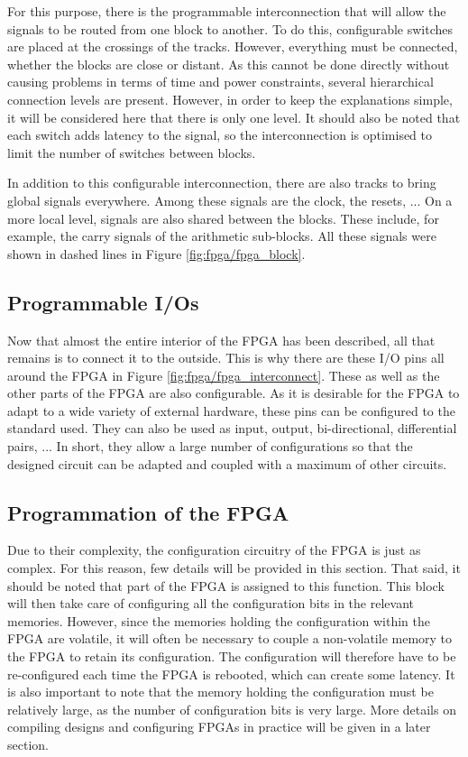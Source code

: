 For this purpose, there is the programmable interconnection that will allow the signals to be routed 
from one block to another. To do this, configurable switches are placed at the crossings of the 
tracks. However, everything must be connected, whether the blocks are close or distant. As this 
cannot be done directly without causing problems in terms of time and power constraints, several 
hierarchical connection levels are present. However, in order to keep the explanations simple, it 
will be considered here that there is only one level. It should also be noted that each switch adds 
latency to the signal, so the interconnection is optimised to limit the number of switches between 
blocks. 

In addition to this configurable interconnection, there are also tracks to bring global signals 
everywhere. Among these signals are the clock, the resets, ... On a more local level, signals are 
also shared between the blocks. These include, for example, the carry signals of the arithmetic 
sub-blocks. All these signals were shown in dashed lines in Figure \ref{fig:fpga/fpga_block}.

\subsection{Programmable I/Os}

Now that almost the entire interior of the FPGA has been described, all that remains is to connect 
it to the outside. This is why there are these I/O pins all around the FPGA in Figure 
\ref{fig:fpga/fpga_interconnect}. These as well as the other parts of the FPGA are also 
configurable. As it is desirable for the FPGA to adapt to a wide variety of external hardware, these 
pins can be configured to the standard used. They can also be used as input, output, bi-directional, 
differential pairs, ... In short, they allow a large number of configurations so that the designed 
circuit can be adapted and coupled with a maximum of other circuits.

\subsection{Programmation of the FPGA}

Due to their complexity, the configuration circuitry of the FPGA is just as complex. For this 
reason, few details will be provided in this section. That said, it should be noted that part of 
the FPGA is assigned to this function. This block will then take care of configuring all the 
configuration bits in the relevant memories. However, since the memories holding the configuration 
within the FPGA are volatile, it will often be necessary to couple a non-volatile memory to the 
FPGA to retain its configuration. The configuration will therefore have to be re-configured each 
time the FPGA is rebooted, which can create some latency. It is also important to note that the 
memory holding the configuration must be relatively large, as the number of configuration bits is 
very large. More details on compiling designs and configuring FPGAs in practice will be given in a 
later section.

